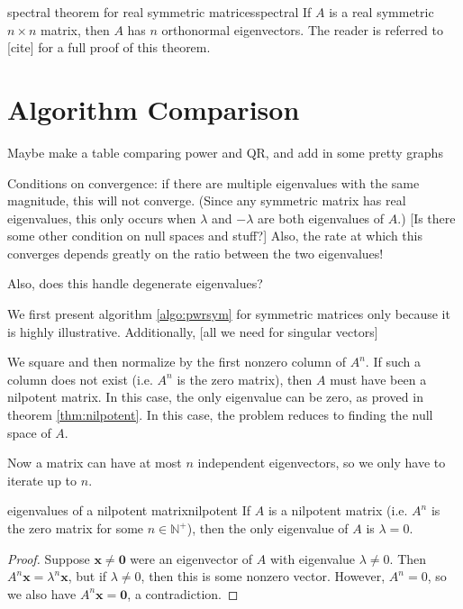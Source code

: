 \documentclass{article}
\let\vec\mathbf
\begin{document}
\begin{theorem}{spectral theorem for real symmetric matrices}{spectral}
  If $A$ is a real symmetric $n \times n$ matrix, then $A$ has $n$ orthonormal eigenvectors. The reader is referred to [cite] for a full proof of this theorem.
\end{theorem}

\section{Algorithm Comparison}
Maybe make a table comparing power and QR, and add in some pretty graphs

Conditions on convergence: if there are multiple eigenvalues with the same magnitude, this will not converge. (Since any symmetric matrix has real eigenvalues, this only occurs when $\lambda$ and $-\lambda$ are both eigenvalues of $A$.) [Is there some other condition on null spaces and stuff?] Also, the rate at which this converges depends greatly on the ratio between the two eigenvalues!

Also, does this handle degenerate eigenvalues?

We first present algorithm \ref{algo:pwrsym} for symmetric matrices only because it is highly illustrative. Additionally, [all we need for singular vectors]

We square and then normalize by the first nonzero column of $A^n$. If such a column does not exist (i.e. $A^n$ is the zero matrix), then $A$ must have been a nilpotent matrix. In this case, the only eigenvalue can be zero, as proved in theorem \ref{thm:nilpotent}. In this case, the problem reduces to finding the null space of $A$.

Now a matrix can have at most $n$ independent eigenvectors, so we only have to iterate up to $n$.

\begin{theorem}{eigenvalues of a nilpotent matrix}{nilpotent}
  If $A$ is a nilpotent matrix (i.e. $A^n$ is the zero matrix for some $n \in \mathbb{N}^+$), then the only eigenvalue of $A$ is $\lambda = 0$.
  \begin{proof}
    Suppose $\vec{x} \neq \vec{0}$ were an eigenvector of $A$ with eigenvalue $\lambda \neq 0$. Then $A^n\vec{x} = \lambda^n\vec{x}$, but if $\lambda \neq 0$, then this is some nonzero vector. However, $A^n = 0$, so we also have $A^n\vec{x} = \vec{0}$, a contradiction.
  \end{proof}
\end{theorem}
\end{document}
